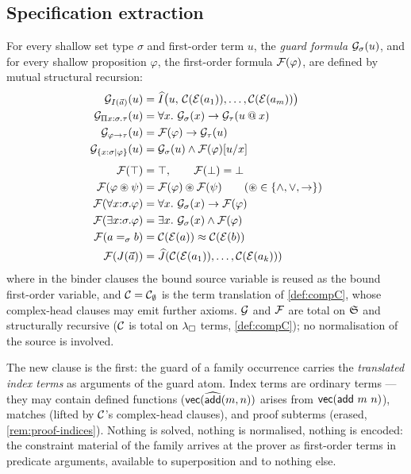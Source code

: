 \subsection{Specification extraction}
\label{sec:translation-spec}

\begin{definition}
\label{def:guard-F}
For every shallow set type $\sigma$ and first-order term $u$, the
\emph{guard formula} $\mathcal{G}_{\sigma}(u)$, and for every shallow
proposition $\varphi$, the first-order formula $\mathcal{F}(\varphi)$, are
defined by mutual structural recursion:
\begin{align*}
  \mathcal{G}_{I(\vec{a})}(u) &= \widehat{I}\bigl(u,\, \mathcal{C}(\mathcal{E}(a_1)), \dots,
    \mathcal{C}(\mathcal{E}(a_m))\bigr)\\
  \mathcal{G}_{\Pi x{:}\sigma.\tau}(u) &=
    \forall x.\ \mathcal{G}_{\sigma}(x) \to \mathcal{G}_{\tau}(u \mathbin{@} x)\\
  \mathcal{G}_{\varphi \to \tau}(u) &= \mathcal{F}(\varphi) \to \mathcal{G}_{\tau}(u)\\
  \mathcal{G}_{\{x{:}\sigma \mid \varphi\}}(u) &=
    \mathcal{G}_{\sigma}(u) \wedge \mathcal{F}(\varphi)[u/x]
  \\[1ex]
  \mathcal{F}(\top) &= \top, \qquad \mathcal{F}(\bot) = \bot\\
  \mathcal{F}(\varphi \circledast \psi) &= \mathcal{F}(\varphi) \circledast \mathcal{F}(\psi)
  \qquad (\circledast \in \{\wedge, \vee, \to\})\\
  \mathcal{F}(\forall x{:}\sigma.\varphi) &=
    \forall x.\ \mathcal{G}_{\sigma}(x) \to \mathcal{F}(\varphi)\\
  \mathcal{F}(\exists x{:}\sigma.\varphi) &=
    \exists x.\ \mathcal{G}_{\sigma}(x) \wedge \mathcal{F}(\varphi)\\
  \mathcal{F}(a =_{\sigma} b) &= \mathcal{C}(\mathcal{E}(a)) \approx \mathcal{C}(\mathcal{E}(b))\\
  \mathcal{F}(J(\vec{a})) &= \widehat{J}(\mathcal{C}(\mathcal{E}(a_1)), \dots,
    \mathcal{C}(\mathcal{E}(a_k)))
\end{align*}
where in the binder clauses the bound source variable is reused as the
bound first-order variable, and $\mathcal{C} = \mathcal{C}_\emptyset$ is the term
translation of \cref{def:compC}, whose complex-head clauses may emit
further axioms.  $\mathcal{G}$ and $\mathcal{F}$ are total on $\mathfrak{S}$ and
structurally recursive ($\mathcal{C}$ is total on $\lambda_{\square}$ terms,
\cref{def:compC}); no normalisation of the source is involved.
\end{definition}

The new clause is the first: the guard of a family occurrence carries
the \emph{translated index terms} as arguments of the guard atom.  Index
terms are ordinary terms --- they may contain defined functions
($\mathsf{vec}(\widehat{\mathsf{add}}(m,n))$ arises from $\mathsf{vec}(\mathsf{add}\ m\
n)$), matches (lifted by $\mathcal{C}$'s complex-head clauses), and proof
subterms (erased, \cref{rem:proof-indices}).  Nothing is solved, nothing
is normalised, nothing is encoded: the constraint material of the family
arrives at the prover as first-order terms in predicate arguments,
available to superposition and to nothing else.

